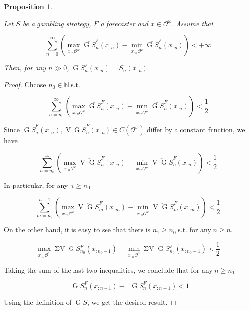 \documentclass[11pt]{article}
\theoremstyle{definition}
\theoremstyle{plain}
\newtheorem{proposition}{Proposition}%
\newcommand{\Nats}{\mathbb{N}}
\newcommand{\Ob}{\mathcal{O}}
\newcommand{\OO}{\Ob^\omega}
\newcommand{\CO}{C(\OO)}
\DeclareMathOperator{\V}{V}
\DeclareMathOperator{\SV}{\Sigma V}
\DeclareMathOperator{\SVM}{\Sigma V_{\min}}
\DeclareMathOperator{\SVX}{\Sigma V_{\max}}
\DeclareMathOperator{\PG}{G}
\begin{document}
\begin{samepage}
\begin{proposition}
\label{prp:when_bounded_play}

Let $S$ be a gambling strategy, $F$ a forecaster and $x \in \OO$. Assume that

\begin{equation}
\sum_{n=0}^\infty {(\max_{x_{:n}\OO} \overline{\PG{S}}^F_n(x_{:n})-\min_{x_{:n}\OO} \overline{\PG{S}}^F_n(x_{:n}))} < +\infty
\end{equation}

Then, for any $n \gg 0$, $\PG{S}^F_n(x_{:n})=S_n(x_{:n})$.

\end{proposition}
\end{samepage}

\begin{proof}

Choose $n_0 \in \Nats$ s.t. 

$$\sum_{n=n_0}^\infty {(\max_{x_{:n}\OO} \overline{\PG{S}}^F_n(x_{:n})-\min_{x_{:n}\OO} \overline{\PG{S}}^F_n(x_{:n}))} < \frac{1}{2}$$

Since $\overline{\PG{S}}^F_n(x_{:n}), \overline{\V{\PG{S}}}^F_n(x_{:n}) \in \CO$ differ by a constant function, we have

$$\sum_{n=n_0}^\infty {(\max_{x_{:n}\OO} \overline{\V{\PG{S}}}^F_n(x_{:n})-\min_{x_{:n}\OO} \overline{\V{\PG{S}}}^F_n(x_{:n}))} < \frac{1}{2}$$

In particular, for any $n \geq n_0$

$$\sum_{m=n_0}^{n-1} {(\max_{x_{:n}\OO} \overline{\V{\PG{S}}}^F_m(x_{:m})-\min_{x_{:n}\OO} \overline{\V{\PG{S}}}^F_m(x_{:m}))} < \frac{1}{2}$$

On the other hand, it is easy to see that there is $n_1 \geq n_0$ s.t. for any $n \geq n_1$

$$\max_{x_{:n}\OO} \SV{\PG{S}}_{n_0}^F(x_{:n_0 - 1}) - \min_{x_{:n}\OO} \SV{\PG{S}}_{n_0}^F(x_{:n_0 - 1}) < \frac{1}{2}$$

Taking the sum of the last two inequalities, we conclude that for any $n \geq n_1$

$$\SVX{\PG{S}}_{n}^F(x_{:n-1}) - \SVM{\PG{S}}_{n}^F(x_{:n-1}) < 1$$

Using the definition of $\PG{S}$, we get the desired result.
\end{proof}
\end{document}
